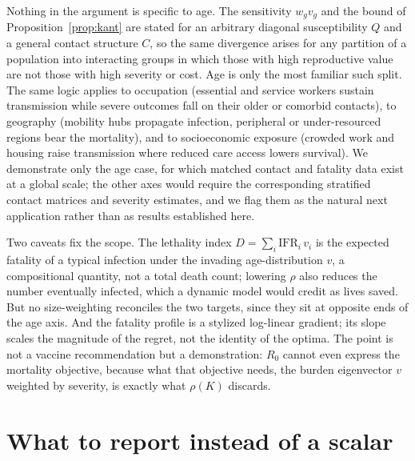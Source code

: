 \documentclass[12pt]{article}
\begin{document}
Nothing in the argument is specific to age. The sensitivity $w_g v_g$ and the bound of Proposition~\ref{prop:kant} are stated for an arbitrary diagonal susceptibility $Q$ and a general contact structure $C$, so the same divergence arises for any partition of a population into interacting groups in which those with high reproductive value are not those with high severity or cost. Age is only the most familiar such split. The same logic applies to occupation (essential and service workers sustain transmission while severe outcomes fall on their older or comorbid contacts), to geography (mobility hubs propagate infection, peripheral or under-resourced regions bear the mortality), and to socioeconomic exposure (crowded work and housing raise transmission where reduced care access lowers survival). We demonstrate only the age case, for which matched contact and fatality data exist at a global scale; the other axes would require the corresponding stratified contact matrices and severity estimates, and we flag them as the natural next application rather than as results established here.

Two caveats fix the scope. The lethality index $D=\sum_i\mathrm{IFR}_i\,v_i$ is the expected fatality of a typical infection under the invading age-distribution $v$, a compositional quantity, not a total death count; lowering $\rho$ also reduces the number eventually infected, which a dynamic model would credit as lives saved. But no size-weighting reconciles the two targets, since they sit at opposite ends of the age axis. And the fatality profile is a stylized log-linear gradient; its slope scales the magnitude of the regret, not the identity of the optima. The point is not a vaccine recommendation but a demonstration: $R_0$ cannot even express the mortality objective, because what that objective needs, the burden eigenvector $v$ weighted by severity, is exactly what $\rho(K)$ discards.

\section{What to report instead of a scalar}\label{sec:report}
\end{document}
